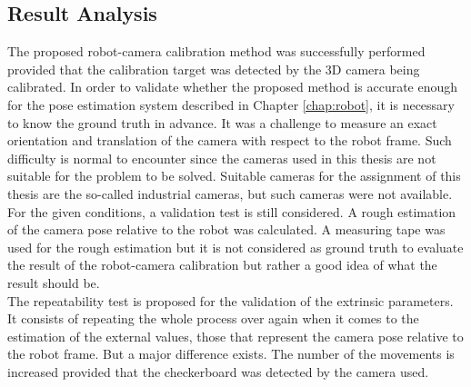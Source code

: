 \subsection{Result Analysis}

The proposed robot-camera calibration method was successfully performed provided that the calibration target was detected by the 3D camera being calibrated. In order to validate whether the proposed method is accurate enough for the pose estimation system described in Chapter \ref{chap:robot}, it is necessary to know the ground truth in advance. It was a challenge to measure an exact orientation and translation of the camera with respect to the robot frame. Such difficulty is normal to encounter since the cameras used in this thesis are not suitable for the problem to be solved. Suitable cameras for the assignment of this thesis are the so-called industrial cameras, but such cameras were not available.  
For the given conditions, a validation test is still considered. A rough estimation of the camera pose relative to the robot was calculated. A measuring tape was used for the rough estimation but it is not considered as ground truth to evaluate the result of the robot-camera calibration but rather a good idea of what the result should be. \\
The repeatability test is proposed for the validation of the extrinsic parameters. It consists of repeating the whole process over again when it comes to the estimation of the external values, those that represent the camera pose relative to the robot frame. But a major difference exists. The number of the movements is increased provided that the checkerboard was detected by the camera used.

